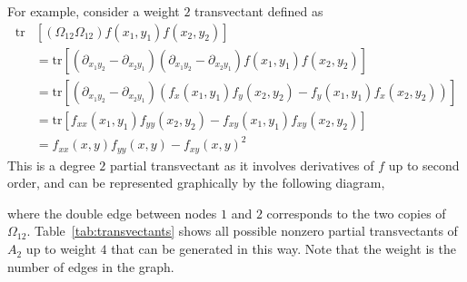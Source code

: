 \documentclass[review,onefignum,onetabnum]{siamonline190516}
\begin{document}
For example, consider a weight $2$ transvectant defined as
\begin{align*}
    \mbox{tr} &\left[(\Omega_{12}\Omega_{12}) f(x_1, y_1)f(x_2, y_2)\right] \\
    &= \mbox{tr}\left[(\partial_{x_1 y_2} - \partial_{x_2y_1})(\partial_{x_1 y_2} -
    \partial_{x_2y_1})f(x_1, y_1)f(x_2, y_2)\right]\\
    &= \mbox{tr}\left[\left(\partial_{x_1 y_2} - \partial_{x_2 y_1}\right)\left(f_x(x_1, y_1)f_y(x_2, y_2) - f_y(x_1, y_1)f_x(x_2, y_2)\right)\right] \\
    &= \mbox{tr}\left[f_{xx}(x_1, y_1)f_{yy}(x_2, y_2) - f_{xy}(x_1, y_1)f_{xy}(x_2, y_2)\right] \\
    &= f_{xx}(x, y) f_{yy}(x, y) - f_{xy}(x, y)^2
\end{align*}
This is a degree $2$ partial transvectant as it involves derivatives of $f$
up to second order, and can be represented graphically by the following
diagram,
\begin{center}
\end{center}
where the double edge between nodes $1$ and $2$ corresponds to the two copies of $\Omega_{12}$.
Table~\ref{tab:transvectants} shows all possible nonzero partial
transvectants of $A_2$ up to weight $4$ that can be generated in this way.
Note that the weight is the number of edges in the graph.
\end{document}
